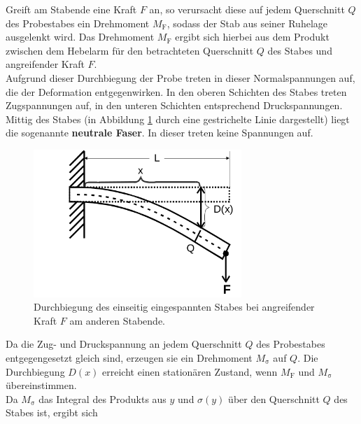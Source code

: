 Greift am Stabende eine Kraft $F$ an, so verursacht diese auf jedem Querschnitt $Q$ des Probestabes ein Drehmoment $M_{\mathrm{F}}$, sodass der Stab aus seiner Ruhelage ausgelenkt wird. Das Drehmoment $M_{\mathrm{F}}$ ergibt sich hierbei aus dem Produkt zwischen dem Hebelarm für den betrachteten Querschnitt $Q$ des Stabes und angreifender Kraft $F$.
\\Aufgrund dieser Durchbiegung der Probe treten in dieser Normalspannungen auf, die der Deformation entgegenwirken.
In den oberen Schichten des Stabes treten Zugspannungen auf, in den unteren Schichten entsprechend Druckspannungen.
\\Mittig des Stabes (in Abbildung \ref{fig:Durchbiegung} durch eine gestrichelte Linie dargestellt) liegt die sogenannte \textbf{neutrale Faser}. In dieser treten keine Spannungen auf.
\begin{figure}
	\centering
	\includegraphics[width=0.7\textwidth]{Bilder/durchbiegungstab.png}
	\caption{Durchbiegung des einseitig eingespannten Stabes bei angreifender Kraft $F$ am anderen Stabende. \cite{Anleitung}}
	\label{fig:Durchbiegung}
\end{figure}
Da die Zug- und Druckspannung an jedem Querschnitt $Q$ des Probestabes entgegengesetzt gleich sind, erzeugen sie ein Drehmoment $M_{\mathrm{\sigma}}$ auf $Q$.
Die Durchbiegung $D(x)$ erreicht einen stationären Zustand, wenn $M_{\mathrm{F}}$ und $M_{\mathrm{\sigma}}$ übereinstimmen. \\
Da $M_{\mathrm{\sigma}}$ das Integral des Produkts aus $y$ und $\sigma(y)$ über den Querschnitt $Q$ des Stabes ist, ergibt sich

